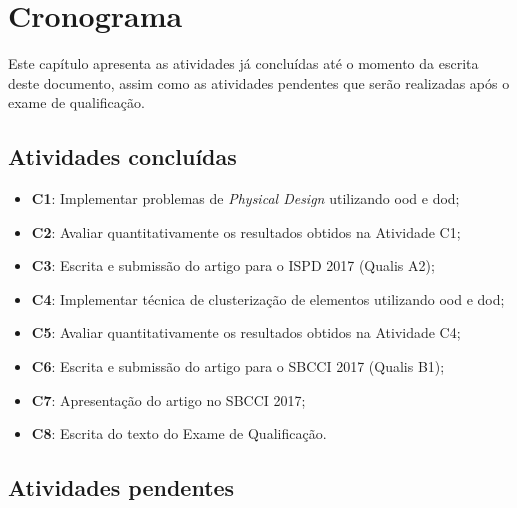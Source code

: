 \chapter{Cronograma}
\label{cap:cronograma}

Este capítulo apresenta as atividades já concluídas até o momento da escrita deste documento, assim como as atividades pendentes que serão realizadas após o exame de qualificação.

\section{Atividades concluídas}

\begin{itemize}
    \item \textbf{C1}: Implementar problemas de \textit{Physical Design} utilizando \ac{ood} e \ac{dod};
    \item \textbf{C2}: Avaliar quantitativamente os resultados obtidos na Atividade C1;
    \item \textbf{C3}: Escrita e submissão do artigo para o ISPD 2017 (Qualis A2);
    \item \textbf{C4}: Implementar técnica de clusterização de elementos utilizando \ac{ood} e \ac{dod};
    \item \textbf{C5}: Avaliar quantitativamente os resultados obtidos na Atividade C4;
    \item \textbf{C6}: Escrita e submissão do artigo para o SBCCI 2017 (Qualis B1);
    \item \textbf{C7}: Apresentação do artigo no SBCCI 2017;
    \item \textbf{C8}: Escrita do texto do Exame de Qualificação.
\end{itemize}

\section{Atividades pendentes}

